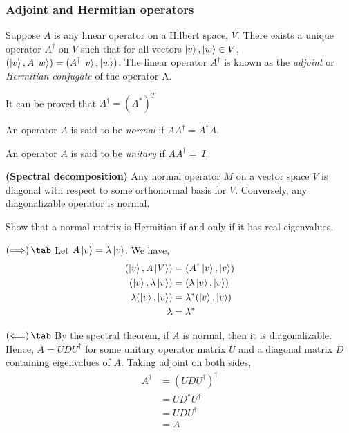 \subsubsection{Adjoint and Hermitian operators}
\begin{definition}
    Suppose $A$ is any linear operator on a Hilbert space, $V$. There exists a unique operator $A^\dag$ on $V$ such that for all vectors $\ket{v}, \ket{w}\in V$, $(\ket{v}, A\ket{w}) = (A^\dag\ket{v}, \ket{w})$. The linear operator $A^\dag$ is known as the \textit{adjoint} or \textit{Hermitian conjugate} of the operator A.
\end{definition}
It can be proved that $A^\dag = (A^\ast)^T$
\begin{definition}
    An operator $A$ is said to be \textit{normal} if $AA^\dag=A^\dag A$.
\end{definition}
\begin{definition}
    An operator $A$ is said to be \textit{unitary} if $AA^\dag=\ I$.
\end{definition}
\begin{theorem}
    \textbf{(Spectral decomposition)} Any normal operator $M$ on a vector space $V$ is diagonal with respect to some orthonormal basis for $V$. Conversely, any diagonalizable operator is normal.
\end{theorem}
\begin{exercise}
    Show that a normal matrix is Hermitian if and only if it has real eigenvalues.
\end{exercise}
\begin{solution}
    $\left(\Longrightarrow\right)\tab$ Let $A\ket{v} = \lambda\ket{v}$. We have,
    \begin{equation*}
    \begin{split}
        (\ket{v}, A\ket{V}) & = (A^\dag\ket{v}, \ket{v}) \\
        (\ket{v}, \lambda\ket{v}) & = (\lambda\ket{v}, \ket{v}) \\
        \lambda(\ket{v}, \ket{v}) & = \lambda^*(\ket{v}, \ket{v}) \\
        \lambda & = \lambda^*
    \end{split}
    \end{equation*}
    
    $\left(\Longleftarrow\right)\tab$ By the spectral theorem, if $A$ is normal, then it is diagonalizable. Hence, $A=UDU^\dag$ for some unitary operator matrix $U$ and a diagonal matrix $D$ containing eigenvalues of $A$. Taking adjoint on both sides,
    \begin{equation*}
    \begin{split}
        A^\dag & = \left(UDU^\dag\right)^\dag \\
        & = UD^\ast U^\dag \\
        & = UDU^\dag \\
        & = A
    \end{split}
    \end{equation*}
\end{solution}

